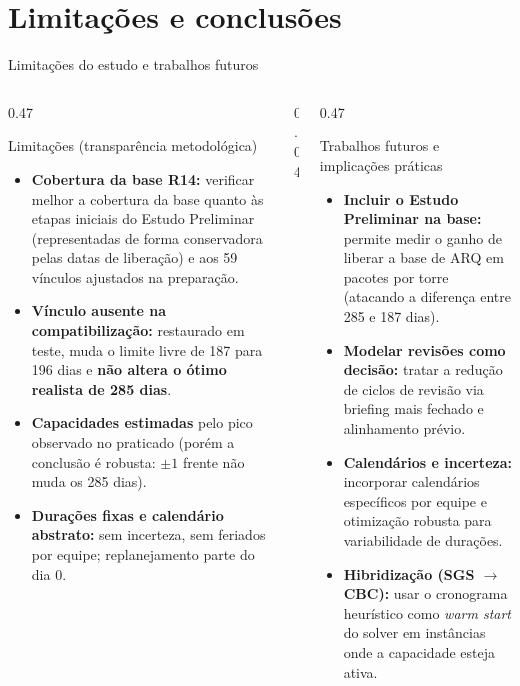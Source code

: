\documentclass[aspectratio=169]{beamer}
\begin{document}
\section{Limitações e conclusões}

\begin{frame}{Limitações do estudo e trabalhos futuros}

\begin{columns}[T,onlytextwidth]

\begin{column}{0.47\textwidth}
\begin{block}{Limitações (transparência metodológica)}
\scriptsize
\begin{itemize}
    \setlength{\itemsep}{0.09cm}
    \item \textbf{Cobertura da base R14:} verificar melhor a cobertura da base quanto às etapas iniciais do Estudo Preliminar (representadas de forma conservadora pelas datas de liberação) e aos 59 vínculos ajustados na preparação.
    \item \textbf{Vínculo ausente na compatibilização:} restaurado em teste, muda o limite livre de 187 para 196 dias e \textbf{não altera o ótimo realista de 285 dias}.
    \item \textbf{Capacidades estimadas} pelo pico observado no praticado (porém a conclusão é robusta: $\pm 1$ frente não muda os 285 dias).
    \item \textbf{Durações fixas e calendário abstrato:} sem incerteza, sem feriados por equipe; replanejamento parte do dia 0.
\end{itemize}
\end{block}
\end{column}

\begin{column}{0.04\textwidth}\end{column}

\begin{column}{0.47\textwidth}
\begin{block}{Trabalhos futuros e implicações práticas}
\scriptsize
\begin{itemize}
    \setlength{\itemsep}{0.09cm}
    \item \textbf{Incluir o Estudo Preliminar na base:} permite medir o ganho de liberar a base de ARQ em pacotes por torre (atacando a diferença entre 285 e 187 dias).
    \item \textbf{Modelar revisões como decisão:} tratar a redução de ciclos de revisão via briefing mais fechado e alinhamento prévio.
    \item \textbf{Calendários e incerteza:} incorporar calendários específicos por equipe e otimização robusta para variabilidade de durações.
    \item \textbf{Hibridização (SGS $\rightarrow$ CBC):} usar o cronograma heurístico como \emph{warm start} do solver em instâncias onde a capacidade esteja ativa.
\end{itemize}
\end{block}
\end{column}


\end{columns}
\end{frame}
\end{document}
